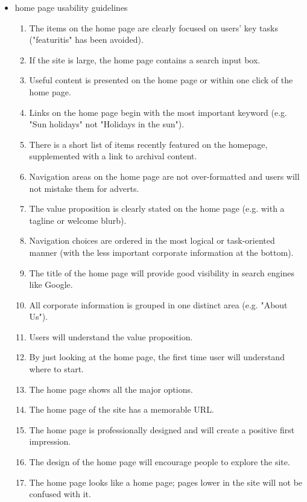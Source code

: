 \begin{itemize}
  \item home page usability guidelines
      \begin{enumerate}
        \item The items on the home page are clearly focused on users' key tasks ("featuritis" has been avoided).
        \item If the site is large, the home page contains a search input box.
        \item Useful content is presented on the home page or within one click of the home page.
        \item Links on the home page begin with the most important keyword (e.g. "Sun holidays" not "Holidays in the sun").
        \item There is a short list of items recently featured on the homepage, supplemented with a link to archival content.
        \item Navigation areas on the home page are not over-formatted and users will not mistake them for adverts.
        \item The value proposition is clearly stated on the home page (e.g. with a tagline or welcome blurb).
        \item Navigation choices are ordered in the most logical or task-oriented manner (with the less important corporate information at the bottom).
        \item The title of the home page will provide good visibility in search engines like Google.
        \item All corporate information is grouped in one distinct area (e.g. "About Us").
        \item Users will understand the value proposition.
        \item By just looking at the home page, the first time user will understand where to start.
        \item The home page shows all the major options.
        \item The home page of the site has a memorable URL.
        \item The home page is professionally designed and will create a positive first impression.
        \item The design of the home page will encourage people to explore the site.
        \item The home page looks like a home page; pages lower in the site will not be confused with it.
      \end{enumerate}

\end{itemize}
